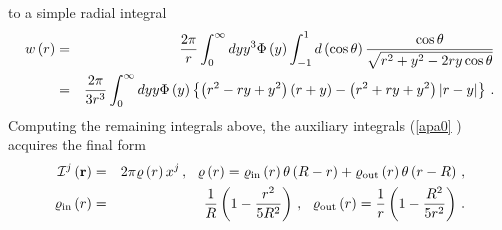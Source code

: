 \documentclass[12pt]{article}
\begin{document}
\begin{appendices}
to a simple radial integral%
\begin{eqnarray*}
w\left( r\right) &=&\frac{2\pi }{r}\int_{0}^{\infty }dyy^{3}\Phi \left(
y\right) \int_{-1}^{1}d\left( \cos \theta \right) \frac{\cos \theta }{\sqrt{%
r^{2}+y^{2}-2ry\cos \theta }} \\
&=&\frac{2\pi }{3r^{3}}\int_{0}^{\infty }dyy\Phi \left( y\right) \left\{
\left( r^{2}-ry+y^{2}\right) \left( r+y\right) -\left( r^{2}+ry+y^{2}\right)
\left\vert r-y\right\vert \right\} \,.
\end{eqnarray*}%
Computing the remaining integrals above, the auxiliary integrals (\ref{apa0}%
) acquires the final form%
\begin{eqnarray}
\mathcal{I}^{j}\left( \mathbf{r}\right) &=&2\pi \varrho \left( r\right)
x^{j}\,,\ \ \varrho \left( r\right) =\varrho _{\mathrm{in}}\left( r\right)
\theta \left( R-r\right) +\varrho _{\mathrm{out}}\left( r\right) \theta
\left( r-R\right) \,,  \notag \\
\varrho _{\mathrm{in}}\left( r\right) &=&\frac{1}{R}\left( 1-\frac{r^{2}}{%
5R^{2}}\right) \,,\ \ \varrho _{\mathrm{out}}\left( r\right) =\frac{1}{r}%
\left( 1-\frac{R^{2}}{5r^{2}}\right) \,.  \label{apa2}
\end{eqnarray}


\end{appendices}
\end{document}

